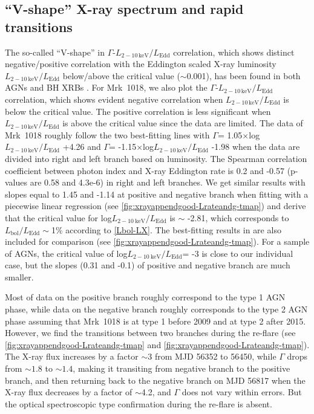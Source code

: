 \documentclass[twocolumn]{aastex63}
\begin{document}
\subsection{``V-shape'' X-ray spectrum and rapid transitions}
The so-called ``V-shape'' in $\Gamma$-$L_\mathrm{2-10\,keV}/L_\mathrm{Edd}$ correlation, which shows distinct negative/positive correlation with the Eddington scaled X-ray luminosity $L_\mathrm{2-10~ keV}/L_\mathrm{Edd}$ below/above the critical value ($\sim$0.001), has been found in both AGNs and BH XRBs \citep[e.g.][]{2011A&A...530A.149Y,2015MNRAS.447.1692Y}. For Mrk~1018, we also plot the $\Gamma$-$L_\mathrm{2-10\,keV}/L_\mathrm{Edd}$ correlation, which shows evident negative correlation when $L_\mathrm{2-10\,keV}/L_\mathrm{Edd}$ is below the critical value. The positive correlation is less significant when $L_\mathrm{2-10\,keV}/L_\mathrm{Edd}$ is above the critical value since the data are limited. The data of Mrk~1018 roughly follow the two best-fitting lines with $\Gamma$= 1.05$\times$log$L_\mathrm{2-10~ keV}/L_\mathrm{Edd}$ +4.26 and $\Gamma$= -1.15$\times$log$L_\mathrm{2-10~ keV}/L_\mathrm{Edd}$ -1.98 when the data are divided into right and left branch based on luminosity. The Spearman correlation coefficient between photon index and X-ray Eddington rate is 0.2 and -0.57 (p-values are 0.58 and 4.3e-6) in right and left branches. We get similar results with slopes equal to 1.45 and -1.14 at positive and negative branch when fitting with a piecewise linear regression (see \autoref{fig:xrayappendgood-Lrateandg-tmap}) and derive that the critical value for log$L_\mathrm{2-10~ keV}/L_\mathrm{Edd}$ is $\sim$ -2.81, which corresponds to $L_\mathrm{bol}/L_\mathrm{Edd}\sim$1\% according to \autoref{Lbol-LX}. The best-fitting results in \citet{2015MNRAS.447.1692Y} are also included for comparison (see \autoref{fig:xrayappendgood-Lrateandg-tmap}). For a sample of AGNs, the critical value of log$L_\mathrm{2-10~ keV}/L_\mathrm{Edd}$= -3 is close to our individual case, but the slopes (0.31 and -0.1) of positive and negative branch are much smaller. 

Most of data on the positive branch roughly correspond to the type 1 AGN phase, while data on the negative branch roughly corresponds to the type 2 AGN phase assuming that Mrk~1018 is at type 1 before 2009 and at type 2 after 2015. However, we find the transitions between two branches during the re-flare (see \autoref{fig:xrayappendgood-Lrateandg-tmap} and \autoref{fig:xrayappendgood-Lrateandg-tmap}). The X-ray flux increases by a factor $\sim3$ from MJD 56352 to 56450, while $\Gamma$ drops from $\sim1.8$ to $\sim1.4$, making it transiting from negative branch to the positive branch, and then returning back to the negative branch on MJD 56817 when the X-ray flux decreases by a factor of $\sim$4.2, and $\Gamma$ does not vary within errors. But the optical spectroscopic type confirmation during the re-flare is absent.
\end{document}
